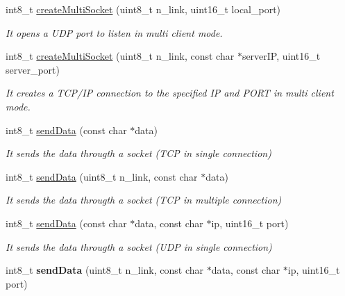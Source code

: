 \begin{DoxyCompactItemize}
int8\+\_\+t \hyperlink{class_wasp3_g_a857e5a3fcaf5ee7b1c868ac0f660b37c}{create\+Multi\+Socket} (uint8\+\_\+t n\+\_\+link, uint16\+\_\+t local\+\_\+port)
\begin{DoxyCompactList}\small\item\em It opens a U\+DP port to listen in multi client mode. \end{DoxyCompactList}\item 
int8\+\_\+t \hyperlink{class_wasp3_g_a6131b6400c965ecc6a5dc518ea220523}{create\+Multi\+Socket} (uint8\+\_\+t n\+\_\+link, const char $\ast$server\+IP, uint16\+\_\+t server\+\_\+port)
\begin{DoxyCompactList}\small\item\em It creates a T\+C\+P/\+IP connection to the specified IP and P\+O\+RT in multi client mode. \end{DoxyCompactList}\item 
int8\+\_\+t \hyperlink{class_wasp3_g_a4071b118cb293815be2274fa252324c5}{send\+Data} (const char $\ast$data)
\begin{DoxyCompactList}\small\item\em It sends the data througth a socket (T\+CP in single connection) \end{DoxyCompactList}\item 
int8\+\_\+t \hyperlink{class_wasp3_g_a617dd2d3227c06051ff44e2f16026bc7}{send\+Data} (uint8\+\_\+t n\+\_\+link, const char $\ast$data)
\begin{DoxyCompactList}\small\item\em It sends the data througth a socket (T\+CP in multiple connection) \end{DoxyCompactList}\item 
int8\+\_\+t \hyperlink{class_wasp3_g_a4baef4a4b1b35427c85a061a104225fc}{send\+Data} (const char $\ast$data, const char $\ast$ip, uint16\+\_\+t port)
\begin{DoxyCompactList}\small\item\em It sends the data througth a socket (U\+DP in single connection) \end{DoxyCompactList}\item 
int8\+\_\+t {\bfseries send\+Data} (uint8\+\_\+t n\+\_\+link, const char $\ast$data, const char $\ast$ip, uint16\+\_\+t port)\hypertarget{class_wasp3_g_aaa7b26502a89bb6a57d2365103758075}{}\label{class_wasp3_g_aaa7b26502a89bb6a57d2365103758075}


\end{DoxyCompactItemize}
